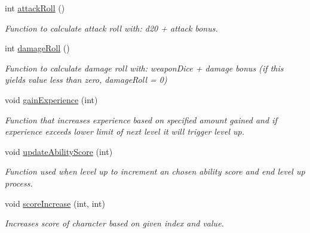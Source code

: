 \begin{DoxyCompactItemize}
int \hyperlink{class_characters_a7b8da28aa1fca4191bf181f6f10ddb23}{attack\+Roll} ()
\begin{DoxyCompactList}\small\item\em Function to calculate attack roll with\+: d20 + attack bonus. \end{DoxyCompactList}\item 
\hypertarget{class_characters_acfbeb255a424493efe9224a1d177ea5c}{}\label{class_characters_acfbeb255a424493efe9224a1d177ea5c} 
int \hyperlink{class_characters_acfbeb255a424493efe9224a1d177ea5c}{damage\+Roll} ()
\begin{DoxyCompactList}\small\item\em Function to calculate damage roll with\+: weapon\+Dice + damage bonus (if this yields value less than zero, damage\+Roll = 0) \end{DoxyCompactList}\item 
\hypertarget{class_characters_a77bd85803742621607c58d7c3593d7b0}{}\label{class_characters_a77bd85803742621607c58d7c3593d7b0} 
void \hyperlink{class_characters_a77bd85803742621607c58d7c3593d7b0}{gain\+Experience} (int)
\begin{DoxyCompactList}\small\item\em Function that increases experience based on specified amount gained and if experience exceeds lower limit of next level it will trigger level up. \end{DoxyCompactList}\item 
\hypertarget{class_characters_af3328b1a080cff8bab2af7597f98be6a}{}\label{class_characters_af3328b1a080cff8bab2af7597f98be6a} 
void \hyperlink{class_characters_af3328b1a080cff8bab2af7597f98be6a}{update\+Ability\+Score} (int)
\begin{DoxyCompactList}\small\item\em Function used when level up to increment an chosen ability score and end level up process. \end{DoxyCompactList}\item 
\hypertarget{class_characters_aef5536d88930d9aff77844d9eec7c71c}{}\label{class_characters_aef5536d88930d9aff77844d9eec7c71c} 
void \hyperlink{class_characters_aef5536d88930d9aff77844d9eec7c71c}{score\+Increase} (int, int)
\begin{DoxyCompactList}\small\item\em Increases score of character based on given index and value. \end{DoxyCompactList}\item 
\hypertarget{class_characters_a4359f1dd1537ed6fac7f5ff47801e4ca}{}\label{class_characters_a4359f1dd1537ed6fac7f5ff47801e4ca} 

\end{DoxyCompactItemize}
